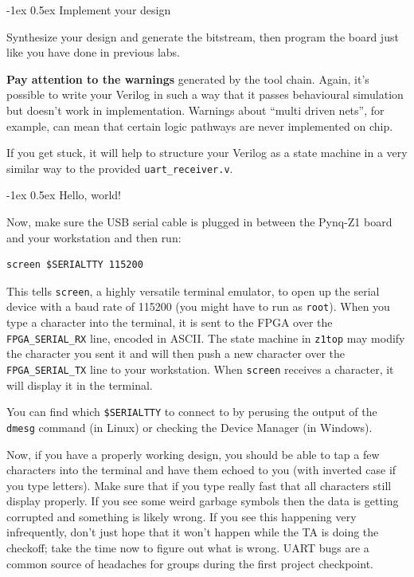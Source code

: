 \documentclass[11pt]{article}
\makeatletter
\renewcommand{\subsection}
{\@startsection {subsection}{1}{0pt}
 {-1ex}
 {0.5ex}
 {\bfseries\normalsize}}
\makeatother
\begin{document}
\subsection{Implement your design}

Synthesize your design and generate the bitstream, then program the board just like you have done in previous labs.

\textbf{Pay attention to the warnings} generated by the tool chain. Again, it's possible to write your Verilog in such a way that it passes behavioural simulation but doesn't work in implementation. Warnings about ``multi driven nets'', for example, can mean that certain logic pathways are never implemented on chip.

If you get stuck, it will help to structure your Verilog as a state machine in a very similar way to the provided \verb|uart_receiver.v|.

\subsection{Hello, world!}

Now, make sure the USB serial cable is plugged in between the Pynq-Z1 board and your workstation and then run:

\begin{verbatim}
screen $SERIALTTY 115200
\end{verbatim}

This tells \verb|screen|, a highly versatile terminal emulator, to open up the serial device with a baud rate of 115200 (you might have to run as \verb|root|). When you type a character into the terminal, it is sent to the FPGA over the \verb|FPGA_SERIAL_RX| line, encoded in ASCII. The state machine in \verb|z1top| may modify the character you sent it and will then push a new character over the \verb|FPGA_SERIAL_TX| line to your workstation. When \verb|screen| receives a character, it will display it in the terminal.

You can find which \verb|$SERIALTTY| to connect to by perusing the output of the \verb|dmesg| command (in Linux) or checking the Device Manager (in Windows).

Now, if you have a properly working design, you should be able to tap a few characters into the terminal and have them echoed to you (with inverted case if you type letters). Make sure that if you type really fast that all characters still display properly. If you see some weird garbage symbols then the data is getting corrupted and something is likely wrong. If you see this happening very infrequently, don't just hope that it won't happen while the TA is doing the checkoff; take the time now to figure out what is wrong. UART bugs are a common source of headaches for groups during the first project checkpoint.
\end{document}
